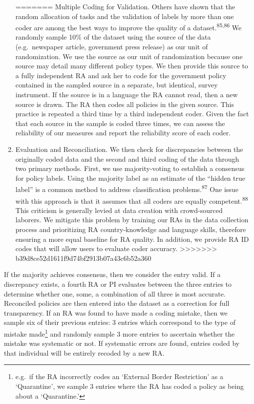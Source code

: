 \documentclass[]{article}
\let\rmarkdownfootnote\footnote%
\def\footnote{\protect\rmarkdownfootnote}
\begin{document}
\begin{enumerate}
=======
  Multiple Coding for Validation. Others have shown that the random allocation of tasks and the validation of labels by more than one coder are among the best ways to improve the quality of a dataset.\textsuperscript{85,86} We randomly sample 10\% of the dataset using the source of the data (e.g.~newspaper article, government press release) as our unit of randomization. We use the source as our unit of randomization because one source may detail many different policy types. We then provide this source to a fully independent RA and ask her to code for the government policy contained in the sampled source in a separate, but identical, survey instrument. If the source is in a language the RA cannot read, then a new source is drawn. The RA then codes all policies in the given source. This practice is repeated a third time by a third independent coder. Given the fact that each source in the sample is coded three times, we can assess the reliability of our measures and report the reliability score of each coder.
\item
  Evaluation and Reconciliation. We then check for discrepancies between the originally coded data and the second and third coding of the data through two primary methods. First, we use majority-voting to establish a consensus for policy labels. Using the majority label as an estimate of the ``hidden true label'' is a common method to address classification problems.\textsuperscript{87} One issue with this approach is that it assumes that all coders are equally competent.\textsuperscript{88} This criticism is generally levied at data creation with crowd-sourced laborers. We mitigate this problem by training our RAs in the data collection process and prioritizing RA country-knowledge and language skills, therefore ensuring a more equal baseline for RA quality. In addition, we provide RA ID codes that will allow users to evaluate coder accuracy.
>>>>>>> b39d8ce52d1611f9d74bf2913b07a43c6b52a360
\end{enumerate}

If the majority achieves consensus, then we consider the entry valid. If a discrepancy exists, a fourth RA or PI evaluates between the three entries to determine whether one, some, a combination of all three is most accurate. Reconciled policies are then entered into the dataset as a correction for full transparency. If an RA was found to have made a coding mistake, then we sample six of their previous entries: 3 entries which correspond to the type of mistake made\footnote{e.g.~if the RA incorrectly codes an `External Border Restriction' as a `Quarantine', we sample 3 entries where the RA has coded a policy as being about a `Quarantine.'} and randomly sample 3 more entries to ascertain whether the mistake was systematic or not. If systematic errors are found, entries coded by that individual will be entirely recoded by a new RA.
\end{document}
